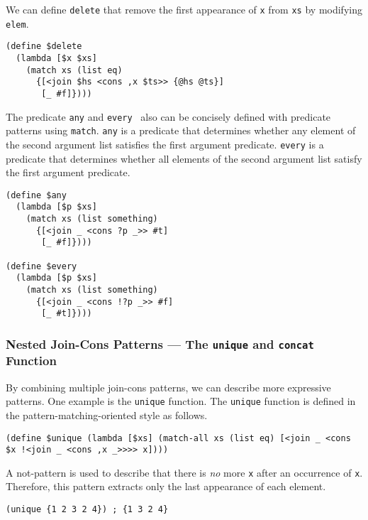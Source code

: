 \documentclass{article}
\begin{document}
\noindent We can define \texttt{delete} that remove the first appearance of \texttt{x} from \texttt{xs} by modifying \texttt{elem}.

{\footnotesize
\begin{lstlisting}[language=egison]
(define $delete
  (lambda [$x $xs]
    (match xs (list eq)
      {[<join $hs <cons ,x $ts>> {@hs @ts}]
       [_ #f]})))
\end{lstlisting}
}


\noindent The predicate \texttt{any} and \texttt{every}~\cite{shivers1999srfi} also can be concisely defined with predicate patterns using \texttt{match}.
\texttt{any} is a predicate that determines whether any element of the second argument list satisfies the first argument predicate.
\texttt{every} is a predicate that determines whether all elements of the second argument list satisfy the first argument predicate.

\begin{lstlisting}[language=egison]
(define $any
  (lambda [$p $xs]
    (match xs (list something)
      {[<join _ <cons ?p _>> #t]
       [_ #f]})))

(define $every
  (lambda [$p $xs]
    (match xs (list something)
      {[<join _ <cons !?p _>> #f]
       [_ #t]})))
\end{lstlisting}

\subsubsection{Nested Join-Cons Patterns --- The \texttt{unique} and \texttt{concat} Function}\label{nested-join-cons}

By combining multiple join-cons patterns, we can describe more expressive patterns.
One example is the \texttt{unique} function.
The \texttt{unique} function is defined in the pattern-matching-oriented style as follows.

\begin{lstlisting}[language=egison]
(define $unique (lambda [$xs] (match-all xs (list eq) [<join _ <cons $x !<join _ <cons ,x _>>>> x])))
\end{lstlisting}

\noindent A not-pattern is used to describe that there is \emph{no} more \texttt{x} after an occurrence of \texttt{x}.
Therefore, this pattern extracts only the last appearance of each element.

\begin{lstlisting}[language=egison]
(unique {1 2 3 2 4}) ; {1 3 2 4}
\end{lstlisting}
\end{document}
